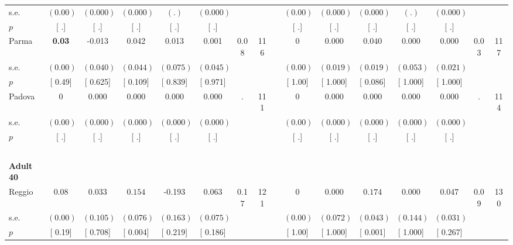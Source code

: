 \begin{longtable}{L{8em} c c c c c c c p{1em} c c c c c c c}
\quad \quad \quad \quad s.e.& $ (     0.00)$ & $ (    0.000)$ & $ (    0.000)$ & $ (        .)$ & $ (    0.000)$ & & & & $ (     0.00)$ & $ (    0.000)$ & $ (    0.000)$ & $ (        .)$ & $ (    0.000)$ & &  \\*
\quad \quad \quad \quad $ p$ & [        .] & [        .] & [        .] & [        .] & [        .] & & & & [        .] & [        .] & [        .] & [        .] & [        .] & &  \\[1em]
\quad \quad \quad Parma& \textbf{     0.03} &    -0.013 &     0.042 &     0.013 &     0.001 &      0.08 &       116 & & 0 &     0.000 & $ \mathbf{    0.040}$ &     0.000 &     0.000 &      0.03 &       117  \\*
\quad \quad \quad \quad s.e.& $ (     0.00)$ & $ (    0.040)$ & $ (    0.044)$ & $ (    0.075)$ & $ (    0.045)$ & & & & $ (     0.00)$ & $ (    0.019)$ & $ (    0.019)$ & $ (    0.053)$ & $ (    0.021)$ & &  \\*
\quad \quad \quad \quad $ p$ & [     0.49] & [    0.625] & [    0.109] & [    0.839] & [    0.971] & & & & [     1.00] & [    1.000] & [    0.086] & [    1.000] & [    1.000] & &  \\[1em]
\quad \quad \quad Padova& 0 &     0.000 &     0.000 &     0.000 &     0.000 &         . &       111 & & 0 &     0.000 &     0.000 &     0.000 &     0.000 &         . &       114  \\*
\quad \quad \quad \quad s.e.& $ (     0.00)$ & $ (    0.000)$ & $ (    0.000)$ & $ (    0.000)$ & $ (    0.000)$ & & & & $ (     0.00)$ & $ (    0.000)$ & $ (    0.000)$ & $ (    0.000)$ & $ (    0.000)$ & &  \\*
\quad \quad \quad \quad $ p$ & [        .] & [        .] & [        .] & [        .] & [        .] & & & & [        .] & [        .] & [        .] & [        .] & [        .] & &  \\[1em]
~\\[1em]
\quad \quad \textbf{Adult 40} & & & & & & & & & & & & & & & \\* 
\quad \quad \quad Reggio& 0.08 &     0.033 & $ \mathbf{    0.154}$ &    -0.193 &     0.063 &      0.17 &       121 & & 0 &     0.000 & $ \mathbf{    0.174}$ &     0.000 &     0.047 &      0.09 &       130  \\*
\quad \quad \quad \quad s.e.& $ (     0.00)$ & $ (    0.105)$ & $ (    0.076)$ & $ (    0.163)$ & $ (    0.075)$ & & & & $ (     0.00)$ & $ (    0.072)$ & $ (    0.043)$ & $ (    0.144)$ & $ (    0.031)$ & &  \\*
\quad \quad \quad \quad $ p$ & [     0.19] & [    0.708] & [    0.004] & [    0.219] & [    0.186] & & & & [     1.00] & [    1.000] & [    0.001] & [    1.000] & [    0.267] & &  \\[1em]

\end{longtable}
